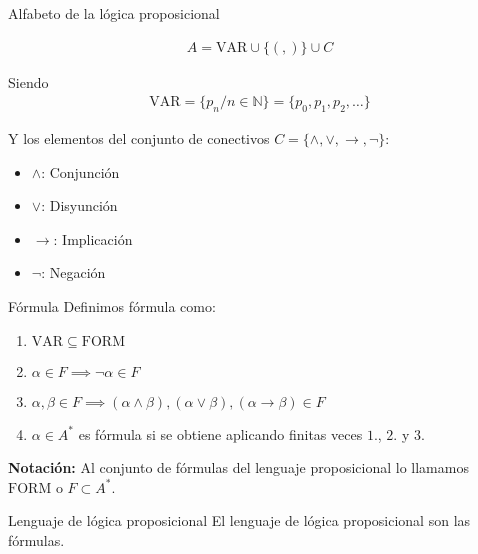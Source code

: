 \begin{definicion}{Alfabeto de la lógica proposicional}{}
    
    \begin{gather*}
        A = \mathrm{VAR} \cup \{ (, ) \} \cup C
    \end{gather*}


    Siendo
    \begin{gather*}
        \mathrm{VAR} = \{ p_n / n \in \mathbb{N} \} = \{ p_0, p_1, p_2, \dots \}
    \end{gather*}

    \medskip

    Y los elementos del conjunto de conectivos 
    $C = \{ \wedge, \vee, \to, \neg \} $: 
    \begin{itemize}
        \item $\wedge$: Conjunción
        \item $\vee$: Disyunción
        \item $\to$: Implicación
        \item $\neg$: Negación
    \end{itemize}
    
\end{definicion}

\bigskip 

\begin{definicion}{Fórmula}{}
    Definimos fórmula como:

    \begin{enumerate}
        \item $\mathrm{VAR} \subseteq \mathrm{FORM}$
        \item $\alpha \in F \implies \neg \alpha \in F$
        \item $\alpha, \beta \in F \implies (\alpha \wedge \beta), 
            (\alpha \vee \beta), (\alpha \to \beta) \in F$
        \item $\alpha \in A^{*}$ es fórmula si se obtiene aplicando 
            finitas veces $1.$, $2.$ y $3.$
    \end{enumerate}

    \bigskip
    \textbf{Notación:}
    Al conjunto de fórmulas del lenguaje proposicional lo llamamos 
    $\mathrm{FORM}$ o $F \subset A^{*}$.
\end{definicion}

\bigskip 

\begin{definicion}{Lenguaje de lógica proposicional}{}
   El lenguaje de lógica proposicional son las fórmulas.
\end{definicion}


